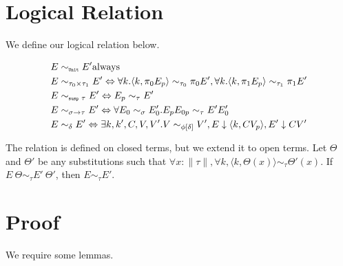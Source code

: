 \section{Logical Relation}
We define our logical relation below.

\begin{align*}
  E &\sim_{\texttt{\tiny{Unit}}} E' \text{always}  \\
  E &\sim_{\tau_0 \times \tau_1} E' \Leftrightarrow \forall k. \langle k, \pi_0 E_p\rangle \sim_{\tau_0} \pi_0 E', \forall k. \langle k, \pi_1 E_p\rangle \sim_{\tau_1} \pi_1 E' \\
  E &\sim_{\texttt{\tiny{susp }} \tau} E' \Leftrightarrow E_p \sim_\tau E' \\
  E &\sim_{\sigma \to \tau} E' \Leftrightarrow \forall E_0 \sim_\sigma E'_0. E_p E_{0p} \sim_\tau E' E'_0 \\
  E &\sim_\delta E' \Leftrightarrow \exists k, k', C, V, V'. V \sim_{\phi[\delta]} V', E \downarrow \langle k, C V_p \rangle, E' \downarrow C V'
\end{align*}

The relation is defined on closed terms, but we extend it to open terms.
Let $\Theta$ and $\Theta'$ be any substitutions such that $\forall x : \|\tau\|, \forall k, \langle k, \Theta(x) \rangle \sim_\tau \Theta'(x)$.
If $E\ \Theta \sim_\tau E'\ \Theta'$, then $E \sim_\tau E'$.

\section{Proof}

We require some lemmas.

